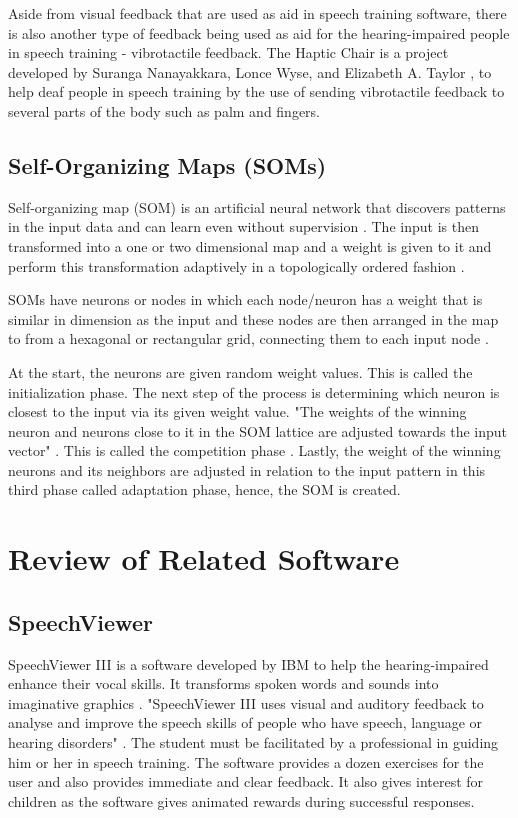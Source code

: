 Aside from visual feedback that are used as aid in speech training software, there is also another type of feedback being used as aid for the hearing-impaired people in speech training - vibrotactile feedback. The Haptic Chair is a project developed by Suranga Nanayakkara, Lonce Wyse, and Elizabeth A. Taylor \citeyear{nanaya:2012:hap}, to help deaf people in speech training by the use of sending vibrotactile feedback to several parts of the body such as palm and fingers.

\subsection{Self-Organizing Maps (SOMs)}

Self-organizing map (SOM) is an artificial neural network that discovers patterns in the input data and can learn even without supervision \cite{kohonen:1988:pho}. The input is then transformed into a one or two dimensional map and a weight is given to it and perform this transformation adaptively in a topologically ordered fashion \cite{chandar:2013:srs}.

SOMs have neurons or nodes in which each node/neuron has a weight that is similar in dimension as the input and these nodes are then arranged in the map to from a hexagonal or rectangular grid, connecting them to each input node \cite{agustin:2014:SOM}.

At the start, the neurons are given random weight values. This is called the initialization phase. The next step of the process is determining which neuron is closest to the input via its given weight value. "The weights of the winning neuron and neurons close to it in the SOM lattice are adjusted towards the input vector" \cite{chandar:2013:srs}. This is called the competition phase \cite{agustin:2014:SOM}. Lastly, the weight of the winning neurons and its neighbors are adjusted in relation to the input pattern in this third phase called adaptation phase, hence, the SOM is created.

\section{Review of Related Software}

\subsection{SpeechViewer}
SpeechViewer III is a software developed by IBM to help the hearing-impaired enhance their vocal skills. It transforms spoken words and sounds into imaginative graphics \cite{speechville:2014:slp}. "SpeechViewer III uses visual and auditory feedback to analyse and improve the speech skills of people who have speech, language or hearing disorders" \cite{kennedy:1998:spv}. The student must be facilitated by a professional in guiding him or her in speech training. The software provides a dozen exercises for the user and also provides immediate and clear feedback. It also gives interest for children as the software gives animated rewards during successful responses.

